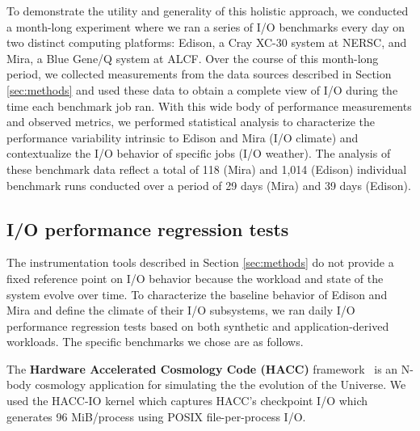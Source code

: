 To demonstrate the utility and generality of this holistic approach, we conducted a month-long experiment where we ran a series of I/O benchmarks every day on two distinct computing platforms:
Edison, a Cray XC-30 system at NERSC, and Mira, a Blue Gene/Q system at ALCF.
Over the course of this month-long period, we collected measurements from the data sources described in Section \ref{sec:methods} and used these data to
obtain a complete view of I/O during the time each benchmark job ran.
With this wide body of performance measurements and observed metrics, we performed statistical analysis to characterize the performance variability intrinsic to Edison and Mira (I/O climate) and contextualize the I/O behavior of specific jobs (I/O weather).
The analysis of these benchmark data reflect a total of 118 (Mira) and 1,014 (Edison) individual benchmark runs conducted over a period of 29 days (Mira) and 39 days (Edison).

\subsection{I/O performance regression tests} \label{sec:methods/tests}

The instrumentation tools described in Section \ref{sec:methods} do not provide a fixed reference point on I/O behavior because
the workload and state of the system evolve over time.
To characterize the baseline behavior of Edison and Mira and define the climate of their I/O subsystems, we ran daily I/O performance regression tests based on both synthetic and application-derived workloads.
The specific benchmarks we chose are as follows.

The \textbf{Hardware Accelerated Cosmology Code (HACC)} framework~\cite{habib2012} is an N-body cosmology application
for simulating the the evolution of the Universe.
We used the HACC-IO kernel which captures HACC's checkpoint I/O which generates
96 MiB/process 
using POSIX file-per-process I/O.

